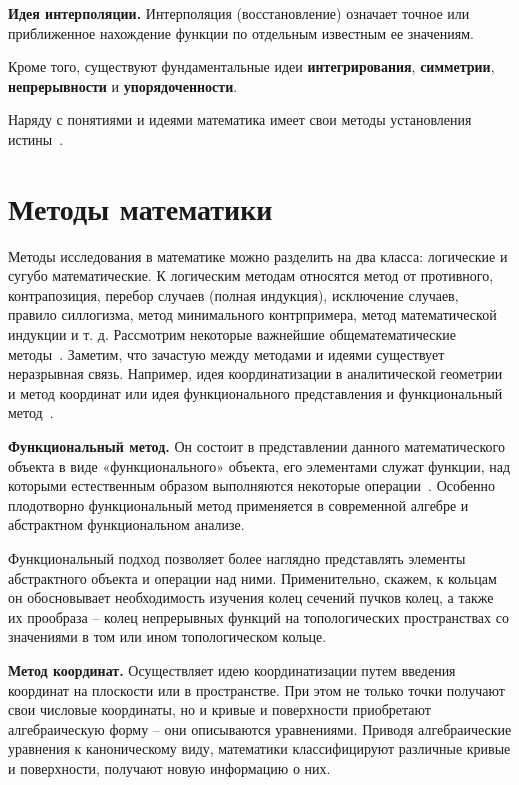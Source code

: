 \textbf{Идея интерполяции.} Интерполяция (восстановление) означает точное или приближенное нахождение функции по отдельным известным ее значениям.

Кроме того, существуют фундаментальные идеи \textbf{интегрирования}, \textbf{симметрии}, \textbf{непрерывности} и \textbf{упорядоченности}.

Наряду с понятиями и идеями математика имеет свои методы установления истины~\cite{вечтомов2013философия}.

\section{Методы математики}

Методы исследования в математике можно разделить на два класса: логические и сугубо математические. К логическим методам относятся метод от противного, контрапозиция, перебор случаев (полная индукция), исключение случаев, правило силлогизма, метод минимального контрпримера, метод математической индукции и т. д. Рассмотрим некоторые важнейшие общематематические методы~\cite{александров1956общий}. Заметим, что зачастую между методами и идеями существует неразрывная связь. Например, идея координатизации в аналитической геометрии и метод координат или идея функционального представления и функциональный метод~\cite{вечтомов2013философия}.

\textbf{Функциональный метод.} Он состоит в представлении данного математического объекта в виде «функционального» объекта, его элементами служат функции, над которыми естественным образом выполняются некоторые операции~\cite{коллатц1969функциональный}. Особенно плодотворно функциональный метод применяется в современной алгебре и абстрактном функциональном анализе.

Функциональный подход позволяет более наглядно представлять элементы абстрактного объекта и операции над ними. Применительно, скажем, к кольцам он обосновывает необходимость изучения колец сечений пучков колец, а также их прообраза – колец непрерывных функций на топологических пространствах со значениями в том или ином топологическом кольце. 

\textbf{Метод координат.} Осуществляет идею координатизации путем введения координат на плоскости или в пространстве. При этом не только точки получают свои числовые координаты, но и кривые и поверхности приобретают алгебраическую форму – они описываются уравнениями. Приводя алгебраические уравнения к каноническому виду, математики классифицируют различные кривые и поверхности, получают новую информацию о них.

